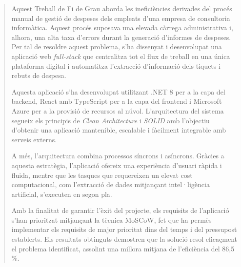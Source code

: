 \renewcommand{\abstractname}{Resum}

\begin{abstract}
Aquest Treball de Fi de Grau aborda les ineficiències derivades del procés manual de gestió de despeses dels empleats d'una empresa de consultoria informàtica. Aquest procés suposava una elevada càrrega administrativa i, alhora, una alta taxa d'errors durant la generació d'informes de despeses. Per tal de resoldre aquest problema, s'ha dissenyat i desenvolupat una aplicació web \textit{full-stack} que centralitza tot el flux de treball en una única plataforma digital i automatitza l'extracció d'informació dels tiquets i rebuts de despesa.

Aquesta aplicació s'ha desenvolupat utilitzant .NET 8 per a la capa del backend, React amb TypeScript per a la capa del frontend i Microsoft Azure per a la provisió de recursos al núvol. L'arquitectura del sistema segueix els principis de \textit{Clean Architecture} i \textit{SOLID} amb l'objectiu d'obtenir una aplicació mantenible, escalable i fàcilment integrable amb serveis externs. 

A més, l'arquitectura combina processos síncrons i asíncrons. Gràcies a aquesta estratègia, l'aplicació ofereix una experiència d'usuari ràpida i fluida, mentre que les tasques que requereixen un elevat cost computacional, com l'extracció de dades mitjançant intel·ligència artificial, s'executen en segon pla.

Amb la finalitat de garantir l'èxit del projecte, els requisits de l'aplicació s'han prioritzat mitjançant la tècnica MoSCoW, fet que ha permès implementar els requisits de major prioritat dins del temps i del pressupost establerts. Els resultats obtinguts demostren que la solució resol eficaçment el problema identificat, assolint una millora mitjana de l'eficiència del 86,5 \%.
\end{abstract}

\renewcommand{\abstractname}{Abstract}